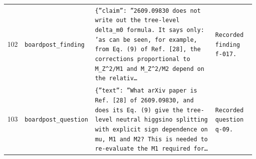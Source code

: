 \documentclass[11pt,a4paper]{article}
\begin{document}
\begin{longtable}{@{}p{}p{}p{}p{}@{}}
102 & \texttt{board}\newline\texttt{post\_\allowbreak{}finding} & \texttt{\{''claim'':\allowbreak{} ''2609.09830 does not write out the tree-level delta\_\allowbreak{}m0 formula. It says only:\allowbreak{} 'as can be seen,\allowbreak{} for example,\allowbreak{} from Eq. (9)\allowbreak{} of Ref. [28]\allowbreak{},\allowbreak{} the corrections proportional to M\_\allowbreak{}Z\textasciicircum{}\allowbreak{}2/\allowbreak{}M1 and M\_\allowbreak{}Z\textasciicircum{}\allowbreak{}2/\allowbreak{}M2 depend on the relativ\ldots{}\allowbreak{}} & \texttt{Recorded finding f-017.} \\
103 & \texttt{board}\newline\texttt{post\_\allowbreak{}question} & \texttt{\{''text'':\allowbreak{} ''What arXiv paper is Ref. [28]\allowbreak{} of 2609.09830,\allowbreak{} and does its Eq. (9)\allowbreak{} give the tree-level neutral higgsino splitting with explicit sign dependence on mu,\allowbreak{} M1 and M2? This is needed to re-evaluate the M1 required for\ldots{}\allowbreak{}} & \texttt{Recorded question q-09.} \\
\bottomrule\end{longtable}
\end{document}
